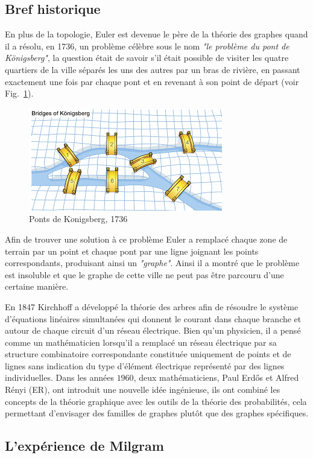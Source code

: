   \subsection{Bref historique}
  En plus de la topologie, Euler est devenue le père de la théorie des graphes quand il a résolu, en 1736, un problème célèbre
sous le nom \textit{"le problème du pont de K\"{o}nigsberg"}, la question était de savoir s'il était possible de visiter les quatre
quartiers de la ville séparés les uns des autres par un bras de rivière, en passant exactement une fois par chaque pont et en 
revenant à son point de départ (voir Fig.~\ref{Konig}).
\begin{figure}[h!]
\centering
\includegraphics[scale=0.7]{./figures/Konig}
\caption{Ponts de K$\ddot{o}$nigsberg, 1736}
\label{Konig}
\end{figure}
Afin de trouver une solution à ce problème Euler a remplacé chaque zone de terrain par un point et chaque pont par une ligne 
joignant les points correspondants, produisant ainsi un \textit{"graphe"}. Ainsi il a montré que le problème
est insoluble et que le graphe de cette ville ne peut pas être parcouru d'une certaine manière.

En 1847 Kirchhoff a développé la théorie des arbres afin de résoudre le système d'équations linéaires simultanées qui 
donnent le courant dans chaque branche et autour de chaque circuit d'un réseau électrique. Bien qu'un physicien, il a pensé comme un mathématicien lorsqu'il a remplacé un réseau électrique par sa structure combinatoire  correspondante constituée uniquement de points et de lignes sans indication du type d'élément électrique représenté par des lignes individuelles.
Dans les années $1960$, deux mathématiciens, Paul Erd\H{o}s et Alfred Rényi (ER), ont introduit une nouvelle idée ingénieuse, ils ont 
combiné les concepts de la théorie graphique avec les outils de la théorie des probabilités, cela permettant d'envisager des
familles de graphes plutôt que des graphes spécifiques.

  \subsection{L’expérience de Milgram}
  
